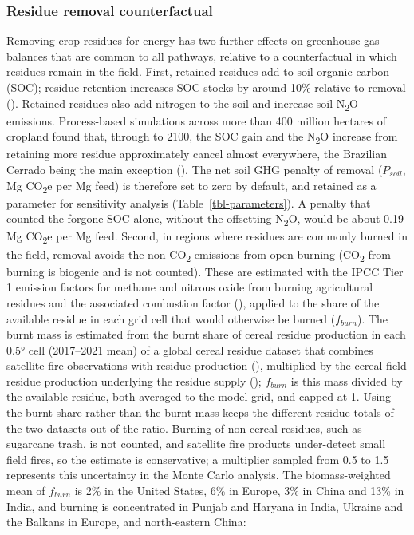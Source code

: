 \documentclass[
  letterpaper,
]{article}
\begin{document}
\subsubsection{Residue removal
counterfactual}\label{residue-removal-counterfactual}

Removing crop residues for energy has two further effects on greenhouse
gas balances that are common to all pathways, relative to a
counterfactual in which residues remain in the field. First, retained
residues add to soil organic carbon (SOC); residue retention increases
SOC stocks by around 10\% relative to removal
(). Retained residues also add
nitrogen to the soil and increase soil N\textsubscript{2}O emissions.
Process-based simulations across more than 400 million hectares of
cropland found that, through to 2100, the SOC gain and the
N\textsubscript{2}O increase from retaining more residue approximately
cancel almost everywhere, the Brazilian Cerrado being the main exception
(). The net soil GHG penalty of
removal (\(P_{soil}\), Mg CO\textsubscript{2}e per Mg feed) is therefore
set to zero by default, and retained as a parameter for sensitivity
analysis (Table~\ref{tbl-parameters}). A penalty that counted the
forgone SOC alone, without the offsetting N\textsubscript{2}O, would be
about 0.19 Mg CO\textsubscript{2}e per Mg feed. Second, in regions where
residues are commonly burned in the field, removal avoids the
non-CO\textsubscript{2} emissions from open burning (CO\textsubscript{2}
from burning is biogenic and is not counted). These are estimated with
the IPCC Tier 1 emission factors for methane and nitrous oxide from
burning agricultural residues and the associated combustion factor
(), applied to the share of the
available residue in each grid cell that would otherwise be burned
(\(f_{burn}\)). The burnt mass is estimated from the burnt share of
cereal residue production in each 0.5° cell (2017--2021 mean) of a
global cereal residue dataset that combines satellite fire observations
with residue production (),
multiplied by the cereal field residue production underlying the residue
supply (); \(f_{burn}\) is this mass
divided by the available residue, both averaged to the model grid, and
capped at 1. Using the burnt share rather than the burnt mass keeps the
different residue totals of the two datasets out of the ratio. Burning
of non-cereal residues, such as sugarcane trash, is not counted, and
satellite fire products under-detect small field fires, so the estimate
is conservative; a multiplier sampled from 0.5 to 1.5 represents this
uncertainty in the Monte Carlo analysis. The biomass-weighted mean of
\(f_{burn}\) is 2\% in the United States, 6\% in Europe, 3\% in China
and 13\% in India, and burning is concentrated in Punjab and Haryana in
India, Ukraine and the Balkans in Europe, and north-eastern China:
\end{document}
